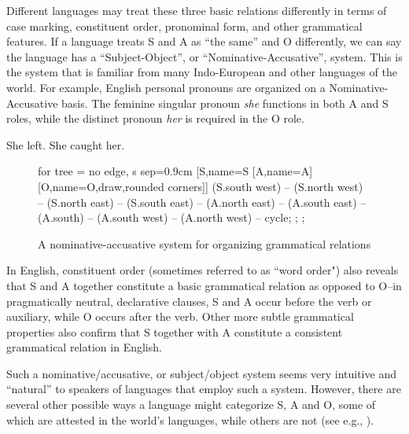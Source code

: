 Different languages may treat these three basic relations differently in terms of case marking, constituent order, pronominal form, and other grammatical features. If a language treats S and A as “the same” and O differently, we can say the language has a “Subject-Object”, or “Nominative-Accusative”, system. This is the system that is familiar from many Indo-European and other languages of the world. For example, English personal pronouns are organized on a Nominative-Accusative basis. The feminine singular pronoun \textit{she} functions in both A and S roles, while the distinct pronoun \textit{her} is required in the O role.

\ea 
        \ea She left.
	\ex She caught her.
	\z
\z
\begin{figure}
	\caption{A nominative-accusative system for organizing grammatical relations}
	\begin{forest} for tree = {no edge, s sep=0.9cm}
		[S,name=S [A,name=A] [O,name=O,draw,rounded corners]]
		  (S.south west) -- (S.north west) -- (S.north east) -- (S.south east) -- (A.north east) -- (A.south east) -- (A.south)  -- (A.south west) -- (A.north west) -- cycle;
		;
		;
	\end{forest}
\end{figure}

In English, constituent order  (sometimes referred to as “word order") also reveals that S and A together constitute a basic grammatical relation as opposed to O--in pragmatically neutral, declarative clauses, S and A occur before the verb or auxiliary, while O occurs after the verb. Other more subtle grammatical properties also confirm that S together with A constitute a consistent grammatical relation in English.

Such a nominative/accusative, or subject/object system seems very intuitive and “natural” to speakers of languages that employ such a system. However, there are several other possible ways a language might categorize S, A and O, some of which are attested in the world’s languages, while others are not (see e.g., \citealt[139--167]{payne1997}).

